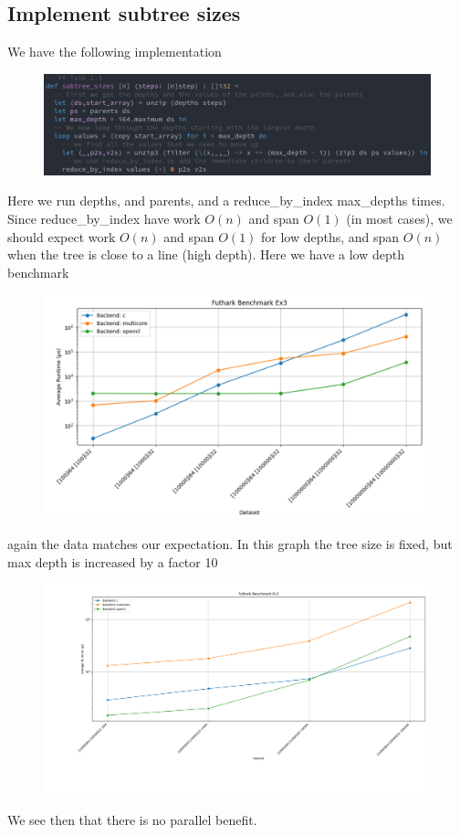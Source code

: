 \documentclass[a4paper,12pt]{article}
\begin{document}
\subsection{Implement subtree sizes}
We have the following implementation
\begin{figure}[H]
	\centering
	\includegraphics[width=\linewidth]{Ex3.png}
\end{figure}
Here we run depths, and parents, and a reduce\_by\_index max\_depths times.
Since reduce\_by\_index have work \(O(n)\) and span \(O(1)\) (in most
cases), we should expect work \(O(n)\) and span \(O(1)\) for low depths, and
span \(O(n)\) when the tree is close to a line (high depth).
Here we have a low depth benchmark
\begin{figure}[H]
	\centering
	\includegraphics[width=\linewidth]{lowdepth.png}
\end{figure}
again the data matches our expectation. In this graph the tree size is
fixed, but max depth is increased by a factor 10
\begin{figure}[htb!]
	\centering
	\includegraphics[width=\linewidth]{highdepth.png}
	\caption{}
\end{figure}
We see then that there is no parallel benefit.
\end{document}
